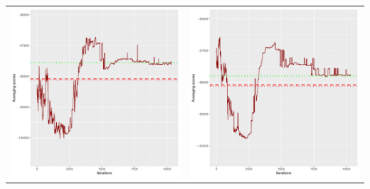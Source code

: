 \documentclass[]{scrartcl}
\begin{document}
\begin{table}[h!]
\begin{tabular}{cc}
\includegraphics[scale = 0.4]{./figs/hepar2/v4/25/avgBoundsEvolution-10352.pdf} & 
\includegraphics[scale = 0.4]{./figs/hepar2/v4/50/avgBoundsEvolution-10352.pdf} \\

\end{tabular}
\end{table}
\end{document}

